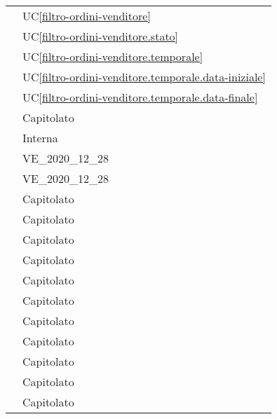 \begin{longtable}{C{6cm} C{6cm}}
     & UC\ref{filtro-ordini-venditore} \\
        
     & UC\ref{filtro-ordini-venditore.stato} \\
        
     & UC\ref{filtro-ordini-venditore.temporale} \\
        
     & UC\ref{filtro-ordini-venditore.temporale.data-iniziale} \\
        
     & UC\ref{filtro-ordini-venditore.temporale.data-finale} \\

     & Capitolato  \\

	 & Interna \\

	 & VE\_2020\_12\_28 \\

	 & VE\_2020\_12\_28 \\

	 & Capitolato \\
	
     & Capitolato \\
	
     & Capitolato \\
    
     & Capitolato \\
    
     & Capitolato \\
    
     & Capitolato \\
    
     & Capitolato \\
    
     & Capitolato \\
    
     & Capitolato \\
    
     & Capitolato \\
    
     & Capitolato \\
    

\end{longtable}
